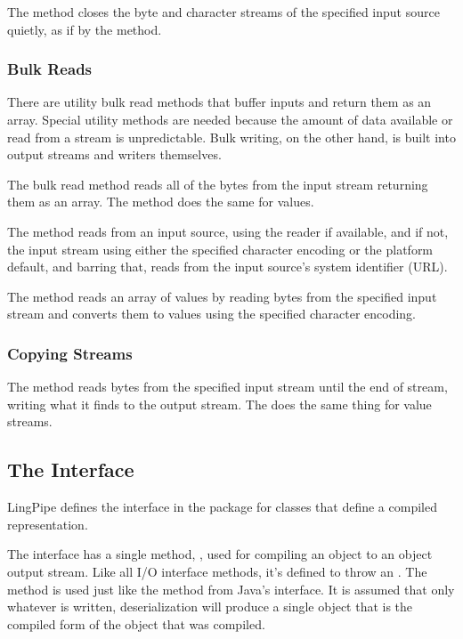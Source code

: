 The method  closes the byte
and character streams of the specified input source quietly, as
if by the  method.

\subsubsection{Bulk Reads}

There are utility bulk read methods that buffer inputs and return them
as an array.  Special utility methods are needed because the amount of
data available or read from a stream is unpredictable.  Bulk writing,
on the other hand, is built into output streams and writers
themselves.

The bulk read method  reads all of the
bytes from the input stream returning them as an array.  The method
 does the same for  values.

The method  reads from an input source,
using the reader if available, and if not, the input stream using
either the specified character encoding or the platform default, and
barring that, reads from the input source's system identifier (URL).

The method  reads an array of
 values by reading bytes from the specified input stream
and converts them to  values using the specified character
encoding. 

\subsubsection{Copying Streams}

The method  reads bytes from the
specified input stream until the end of stream, writing what it finds
to the output stream.  The  does the same
thing for  value streams.

\subsection{The  Interface}\label{section:io-compilable}

LingPipe defines the interface  in the package
 for classes that define a compiled
representation.  

The  interface has a single method,
, used for compiling an object to an
object output stream.  Like all I/O interface methods, it's defined to
throw an .  The method is used just like the
 method from Java's
 interface.  It is assumed that only whatever is
written, deserialization will produce a single object that is the
compiled form of the object that was compiled.

